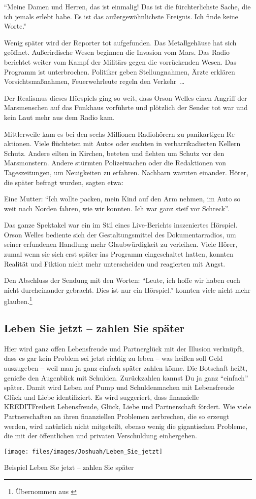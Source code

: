 \enquote{Meine Damen und Herren, das ist einmalig! Das ist die fürchterlichste Sache, die ich jemals erlebt
habe. Es ist das außergewöhnlichste Ereignis. Ich finde keine Worte.}

Wenig später wird der Reporter tot aufgefunden. Das Metallgehäuse hat sich geöffnet. Außerirdische
Wesen beginnen die Invasion vom Mars. Das Radio berichtet weiter vom Kampf der Militärs gegen die
vorrückenden Wesen. Das Programm ist unterbrochen. Politiker geben Stellungnahmen, Ärzte erklären
Vorsichtsmaßnahmen, Feuerwehrleute regeln den Verkehr~\dots

Der Realismus dieses Hörspiels ging so weit, dass Orson Welles einen Angriff der Marsmenschen auf das
Funkhaus vorführte und plötzlich der Sender tot war und kein Laut mehr aus dem Radio kam.

Mittlerweile kam es bei den sechs Millionen Radiohörern zu panikartigen Re-aktionen. Viele flüchteten
mit Autos oder suchten in verbarrikadierten Kellern Schutz. Andere eilten in Kirchen, beteten und
flehten um Schutz vor den Marsmonstern. Andere stürmten Polizeiwachen oder die Redaktionen von
Tageszeitungen, um Neuigkeiten zu erfahren. Nachbarn warnten einander. Hörer, die später befragt
wurden, sagten etwa:

Eine Mutter: \enquote{Ich wollte packen, mein Kind auf den Arm nehmen, im Auto so weit nach Norden fahren,
wie wir konnten. Ich war ganz steif vor Schreck}.

Das ganze Spektakel war ein im Stil eines Live-Berichts inszeniertes Hörspiel. Orson Welles bediente
sich der Gestaltungsmittel des Dokumentarradios, um seiner erfundenen Handlung mehr Glaubwürdigkeit
zu verleihen. Viele Hörer, zumal wenn sie sich erst später ins Programm eingeschaltet hatten, konnten
Realität und Fiktion nicht mehr unterscheiden und reagierten mit Angst.

Den Abschluss der Sendung mit den Worten: \enquote{Leute, ich hoffe wir haben euch nicht durcheinander
gebracht. Dies ist nur ein Hörspiel.} konnten viele nicht mehr glauben.\footnote{Übernommen aus
\cite[4]{Stuttgart:Manipulation}}

\subsection{Leben Sie jetzt -- zahlen Sie später}
Hier wird ganz offen Lebensfreude und Partnerglück mit der Illusion verknüpft, dass es gar kein
Problem sei jetzt richtig zu leben -- was heißen soll Geld auszugeben -- weil man ja ganz einfach
später zahlen könne. Die Botschaft heißt, genieße den Augenblick mit Schulden. Zurückzahlen kannst Du
ja ganz \enquote{einfach} später. Damit wird Leben auf Pump und Schuldenmachen mit
Lebensfreude Glück und Liebe identifiziert. Es wird suggeriert, dass finanzielle KREDITFreiheit
Lebensfreude, Glück, Liebe und Partnerschaft fördert. Wie viele Partnerschaften an ihren finanziellen
Problemen zerbrechen, die so erzeugt werden, wird natürlich nicht mitgeteilt, ebenso wenig die
gigantischen Probleme, die mit der öffentlichen und privaten Verschuldung einhergehen.

\begin{figurewrapper}
	\texttt{[image: files/images/Joshuah/Leben\_Sie\_jetzt]}
	\caption{Beispiel Leben Sie jetzt -- zahlen Sie später}
\end{figurewrapper}


\clearpage
\printbibliography[heading=source,keyword=Joshuah]

